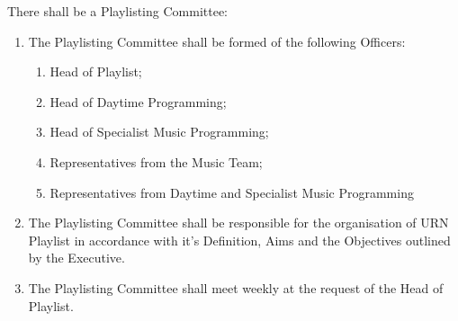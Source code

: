 \item There shall be a Playlisting Committee:
\begin{enumerate}[label*=\arabic*.]
    \item The Playlisting Committee shall be formed of the following Officers:
          \begin{enumerate}[label*=\arabic*.]
              \item Head of Playlist;
              \item Head of Daytime Programming;
              \item Head of Specialist Music Programming;
              \item Representatives from the Music Team;
              \item Representatives from Daytime and Specialist Music Programming
          \end{enumerate}
    \item The Playlisting Committee shall be responsible for the organisation of URN Playlist in accordance with it's Definition, Aims and the Objectives outlined by the Executive.
    \item The Playlisting Committee shall meet weekly at the request of the Head of Playlist.
\end{enumerate}
